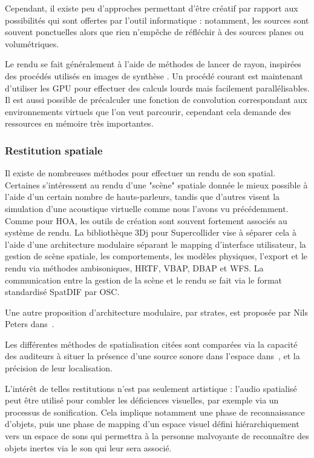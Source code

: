 \documentclass[french,12pt]{article}
\begin{document}
Cependant, il existe peu d'approches permettant d'être créatif par rapport aux possibilités qui sont offertes par l'outil informatique : notamment, les sources sont souvent ponctuelles alors que rien n'empêche de réfléchir à des sources planes ou volumétriques. 

Le rendu se fait généralement à l'aide de méthodes de lancer de rayon, inspirées des procédés utilisés en images de synthèse \cite{funkhouser_beam_1998,tsingos_fast_1998}.
Un procédé courant est maintenant d'utiliser les \ac{GPU} pour effectuer des calculs lourds mais facilement parallélisables\cite{rodriguez_performance_2014,cheng_design_2014,taylor_guided_2012}. Il est aussi possible de précalculer une fonction de convolution correspondant aux environnements virtuels que l'on veut parcourir, cependant cela demande des ressources en mémoire très importantes\cite{raghuvanshi_parametric_2014}.

\subsubsection{Restitution spatiale}
Il existe de nombreuses méthodes pour effectuer un rendu de son spatial. Certaines s'intéressent au rendu d'une "scène" spatiale donnée le mieux possible à l'aide d'un certain nombre de hauts-parleurs, tandis que d'autres visent la simulation d'une acoustique virtuelle comme nous l'avons vu précédemment. Comme pour HOA, les outils de création sont souvent fortement associés au système de rendu. La bibliothèque 3Dj\cite{perez-lopez_3dj_2015} pour Supercollider vise à séparer cela à l'aide d'une architecture modulaire séparant le mapping d'interface utilisateur, la gestion de scène spatiale, les comportements, les modèles physiques, l'export et le rendu via méthodes ambisoniques, HRTF\cite{noisternig_3d_2003}, \ac{VBAP}, \ac{DBAP} et \ac{WFS}.
La communication entre la gestion de la scène et le rendu se fait via le format standardisé SpatDIF\cite{peters_spatial_2013} par OSC. %

Une autre proposition d'architecture modulaire, par strates, est proposée par Nils Peters dans~\cite{peters_stratified_2009}.

Les différentes méthodes de spatialisation citées sont comparées via la capacité des auditeurs à situer la présence d'une source sonore dans l'espace dans~\cite{bates_comparative_2007}, et la précision de leur localisation.

L'intérêt de telles restitutions n'est pas seulement artistique : l'audio spatialisé peut être utilisé pour combler les déficiences visuelles, par exemple via un processus de sonification\cite{tang_assistive_2014}. Cela implique notamment une phase de reconnaissance d'objets, puis une phase de mapping d'un espace visuel défini hiérarchiquement vers un espace de sons qui permettra à la personne malvoyante de reconnaître des objets inertes via le son qui leur sera associé.
\end{document}
